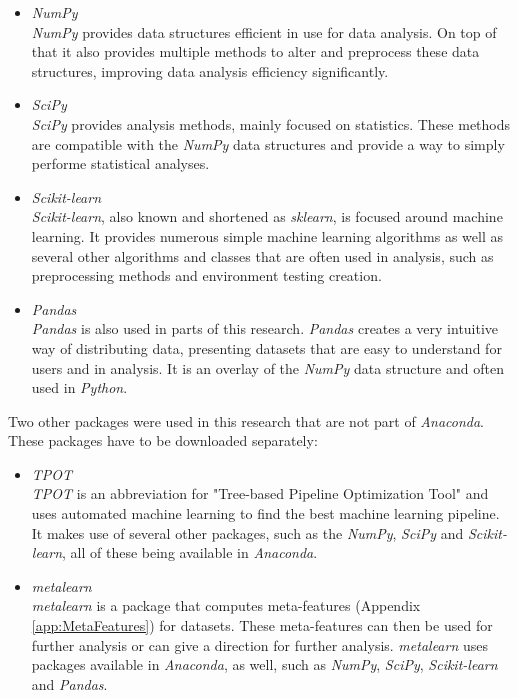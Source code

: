 \documentclass[10pt,a4paper]{report}
\begin{document}
	\begin{itemize}
		\item \textit{NumPy}\cite{walt2011numpy} \\
		\textit{NumPy} provides data structures efficient in use for data analysis. On top of that it also provides multiple methods to alter and preprocess these data structures, improving data analysis efficiency significantly.
		\item \textit{SciPy}\cite{jones2014scipy} \\
		\textit{SciPy} provides analysis methods, mainly focused on statistics. These methods are compatible with the \textit{NumPy} data structures and provide a way to simply performe statistical analyses.
		\item \textit{Scikit-learn}\cite{pedregosa2011scikit} \\
		\textit{Scikit-learn}, also known and shortened as \textit{sklearn}, is focused around machine learning. It provides numerous simple machine learning algorithms as well as several other algorithms and classes that are often used in analysis, such as preprocessing methods and environment testing creation.
		\item \textit{Pandas}\cite{mckinney2012python} \\
		\textit{Pandas} is also used in parts of this research. \textit{Pandas} creates a very intuitive way of distributing data, presenting datasets that are easy to understand for users and in analysis. It is an overlay of the \textit{NumPy} data structure and often used in \textit{Python}.
	\end{itemize}
	
	Two other packages were used in this research that are not part of \textit{Anaconda}. These packages have to be downloaded separately:
	
	\begin{itemize}
		\item \textit{TPOT}\cite{olson2016tpot} \\
		\textit{TPOT} is an abbreviation for "Tree-based Pipeline Optimization Tool" and uses automated machine learning to find the best machine learning pipeline. It makes use of several other packages, such as the \textit{NumPy}, \textit{SciPy} and \textit{Scikit-learn}, all of these being available in \textit{Anaconda}.
		\item \textit{metalearn} \\
		\textit{metalearn} is a package that computes meta-features (Appendix \ref{app:MetaFeatures}) for datasets. These meta-features can then be used for further analysis or can give a direction for further analysis. \textit{metalearn} uses packages available in \textit{Anaconda}, as well, such as \textit{NumPy}, \textit{SciPy}, \textit{Scikit-learn} and \textit{Pandas}.
	\end{itemize}
\end{document}
